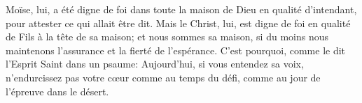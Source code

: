 Moïse, lui, a été digne de foi dans toute la maison de Dieu en qualité d’intendant,
	pour attester ce qui allait être dit.
Mais le Christ, lui, est digne de foi en qualité de Fils à la tête de sa maison;
	et nous sommes sa maison,
		si du moins nous maintenons l’assurance et la fierté de l’espérance.
C’est pourquoi, comme le dit l’Esprit Saint dans un psaume:
	Aujourd’hui, si vous entendez sa voix,
	n’endurcissez pas votre cœur comme au temps du défi,
	comme au jour de l’épreuve dans le désert.
